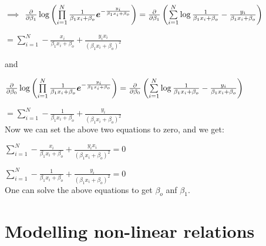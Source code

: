 \documentclass[12pt]{article}
\begin{document}
$\implies$ $\frac{\partial}{\partial \beta_1} \log \left(\prod\limits_{i=1}^{N} \frac{1}{\beta_1x_i + \beta_o} {\boldsymbol e}^{-\frac{y_i}{\beta_1x_i + \beta_o}} \right) = \frac{\partial}{\partial \beta_1} \left(\sum\limits_{i=1}^{N} \log{\frac{1}{\beta_1x_i + \beta_o}} - \frac{y_i}{\beta_1x_i + \beta_o} \right)$

$=\sum\limits_{i=1}^{N} -\frac{x_i}{\beta_1x_i+\beta_o} + \frac{y_ix_i}{(\beta_1x_i + \beta_o)^2}$
\begin{center}
    and
\end{center}
$\frac{\partial}{\partial \beta_0} \log \left(\prod\limits_{i=1}^{N} \frac{1}{\beta_1x_i + \beta_o} {\boldsymbol e}^{-\frac{y_i}{\beta_1x_i + \beta_o}} \right) = \frac{\partial}{\partial \beta_0} \left(\sum\limits_{i=1}^{N} \log{\frac{1}{\beta_1x_i + \beta_o}} - \frac{y_i}{\beta_1x_i + \beta_o} \right)$

$=\sum\limits_{i=1}^{N} -\frac{1}{\beta_1x_i+\beta_o} + \frac{y_i}{(\beta_1x_i + \beta_o)^2}$
\\
Now we can set the above two equations to zero, and we get:

$\sum\limits_{i=1}^{N} -\frac{x_i}{\beta_1x_i+\beta_o} + \frac{y_ix_i}{(\beta_1x_i + \beta_o)^2} = 0$

$\sum\limits_{i=1}^{N} -\frac{1}{\beta_1x_i+\beta_o} + \frac{y_i}{(\beta_1x_i + \beta_o)^2} = 0$\\
One can solve the above equations to get $\beta_o$ anf $\beta_1$.


\section{Modelling non-linear relations}
\end{document}
